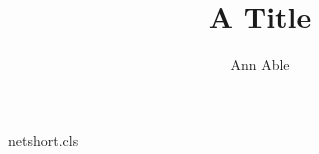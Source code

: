 \begin{filecontents*}[overwrite]{netshort.cls}
\def\@anames{}\def\@grant{}\def\@recd{Received 00 Month 20XX}
\renewcommand\author[1]{\gdef\@anames{#1}}
\newcommand\grant[1]{\gdef\@grant{\ignorespaces#1}}
\newcommand\recd[1]{\gdef\@recd{\ignorespaces#1}}
\renewcommand\@author{\@anames\\Funded by: \@grant\\\@recd}
\end{filecontents*}
\documentclass{netshort}

\title{A Title}
\author{Ann Able}
\maketitle
Text.

